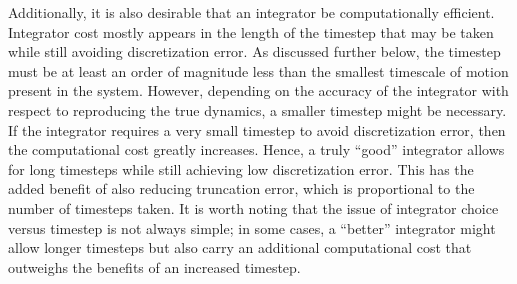 \documentclass[9pt,bestpractices]{livecoms}
\begin{document}
Additionally, it is also desirable that an integrator be computationally efficient.
Integrator cost mostly appears in the length of the timestep that may be taken while still avoiding discretization error. 
As discussed further below, the timestep must be at least an order of magnitude less than the smallest timescale of motion present in the system.
However, depending on the accuracy of the integrator with respect to reproducing the true dynamics, a smaller timestep might be necessary.
If the integrator requires a very small timestep to avoid discretization error, then the computational cost greatly increases.
Hence, a truly ``good'' integrator allows for long timesteps while still achieving low discretization error.
This has the added benefit of also reducing truncation error, which is proportional to the number of timesteps taken.
It is worth noting that the issue of integrator choice versus timestep is not always simple; in some cases, a ``better'' integrator might allow longer timesteps but also carry an additional computational cost that outweighs the benefits of an increased timestep.
\end{document}
